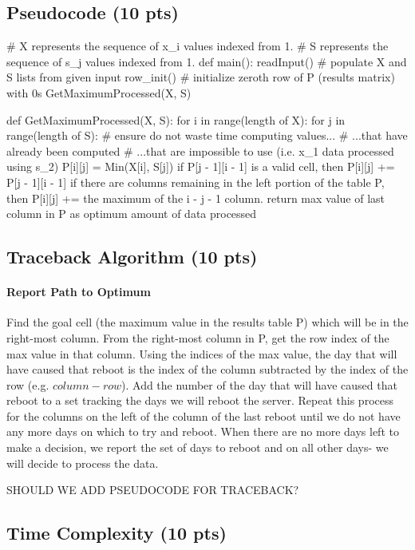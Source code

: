 \documentclass[12pt]{article}
\begin{document}
\subsection{Pseudocode (10 pts)}
\begin{verbatimtab}[4]
# X represents the sequence of x_i values indexed from 1.
# S represents the sequence of s_j values indexed from 1.
def main():
	readInput()	# populate X and S lists from given input
	row_init()	# initialize zeroth row of P (results matrix) with 0s
	GetMaximumProcessed(X, S)

def GetMaximumProcessed(X, S):
	for i in range(length of X):
		for j in range(length of S):
			# ensure do not waste time computing values...
			# ...that have already been computed
			# ...that are impossible to use (i.e. x_1 data processed using s_2)
			P[i][j] = Min(X[i], S[j])
			if P[j - 1][i - 1] is a valid cell,
				then P[i][j] += P[j - 1][i - 1]
			if there are columns remaining in the left portion of the table P,
				then P[i][j] += the maximum of the i - j - 1 column.
	return max value of last column in P as optimum amount of data processed

\end{verbatimtab}
\subsection{Traceback Algorithm (10 pts)}
\paragraph{Report Path to Optimum}
Find the goal cell (the maximum value in the results table P) which will be in the right-most column.
From the right-most column in P, get the row index of the max value in that column.
Using the indices of the max value, the day that will have caused that reboot is the index of the column subtracted by the index of the row (e.g. $column - row$).
Add the number of the day that will have caused that reboot to a set tracking the days we will reboot the server.
Repeat this process for the columns on the left of the column of the last reboot until we do not have any more days on which to try and reboot.
When there are no more days left to make a decision, we report the set of days to reboot and on all other days- we will decide to process the data.
\begin{verbatimtab}[4]
SHOULD WE ADD PSEUDOCODE FOR TRACEBACK?
\end{verbatimtab}
\subsection{Time Complexity (10 pts)}
\end{document}
